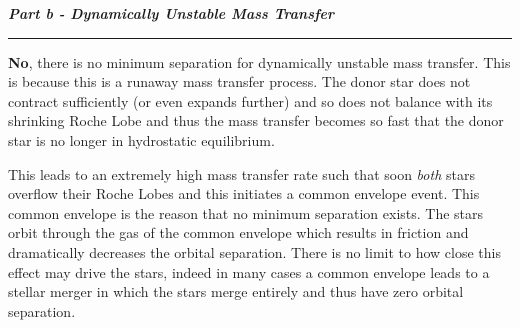 \documentclass[12pt, letterpaper, twoside]{article}
\newcommand{\question}[1]{{\noindent \it #1}}
\newcommand{\answer}[1]{
    \par\noindent\rule{\textwidth}{0.4pt}#1\vspace{0.5cm}
}
\begin{document}
\question{\textbf{Part b - Dynamically Unstable Mass Transfer}}
\answer{
    \textbf{No}, there is no minimum separation for dynamically unstable mass transfer. This is because this is a runaway mass transfer process. The donor star does not contract sufficiently (or even expands further) and so does not balance with its shrinking Roche Lobe and thus the mass transfer becomes so fast that the donor star is no longer in hydrostatic equilibrium.

    This leads to an extremely high mass transfer rate such that soon \textit{both} stars overflow their Roche Lobes and this initiates a common envelope event. This common envelope is the reason that no minimum separation exists. The stars orbit through the gas of the common envelope which results in friction and dramatically decreases the orbital separation. There is no limit to how close this effect may drive the stars, indeed in many cases a common envelope leads to a stellar merger in which the stars merge entirely and thus have zero orbital separation.
}
\end{document}
